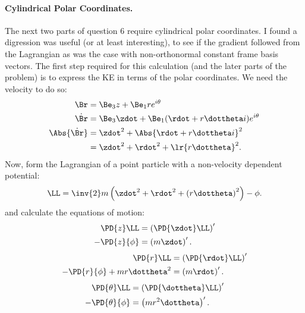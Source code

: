 {\paragraph{Cylindrical Polar Coordinates.}
%
The next two parts of question 6 require cylindrical polar coordinates.  I found a digression was useful (or at least interesting), to see
if the gradient followed from the Lagrangian as was the case with non-orthonormal constant frame basis vectors.
%
The first step required for this calculation (and the later parts of the problem) is to express the KE in terms of the polar coordinates.
We need the velocity to do so:
%
\begin{equation}\label{eqn:tongMf1:660}
\begin{aligned}
\Br &= \Be_3 z + \Be_1 r e^{i\theta} \\
\dot{\Br} &= \Be_3 \zdot + \Be_1 (\rdot + r \dottheta i) e^{i\theta} \\
\Abs{\dot{\Br}}
&= \zdot^2 + \Abs{\rdot + r \dottheta i}^2 \\
&= \zdot^2 + \rdot^2 +
\lr{ r \dottheta }^2 .
\end{aligned}
\end{equation}
%
Now, form the Lagrangian of a point particle with a non-velocity dependent potential:
%
\begin{equation}\label{eqn:tongMf1:1800}
\LL = \inv{2} m \left(\zdot^2 + \rdot^2 + \left(r \dottheta\right)^2\right) - \phi.
\end{equation}
%
and calculate the equations of motion:
\begin{equation}\label{eqn:tongMf1:680}
\begin{aligned}
\PD{z}\LL &= \left(\PD{\zdot}\LL\right)' \\
-\PD{z}{\phi} &= \left(m\zdot\right)' .
\end{aligned}
\end{equation}
\begin{equation}\label{eqn:tongMf1:700}
\begin{aligned}
\PD{r}\LL &= \left(\PD{\rdot}\LL\right)' \\
-\PD{r}{\phi} + m r \dottheta^2 &= \left(m\rdot\right)' .
\end{aligned}
\end{equation}
\begin{equation}\label{eqn:tongMf1:720}
\begin{aligned}
\PD{\theta}\LL &= \left(\PD{\dottheta}\LL\right)' \\
-\PD{\theta}{\phi} &= \left(m r^2 \dottheta\right)' .

\end{aligned}
\end{equation}}
